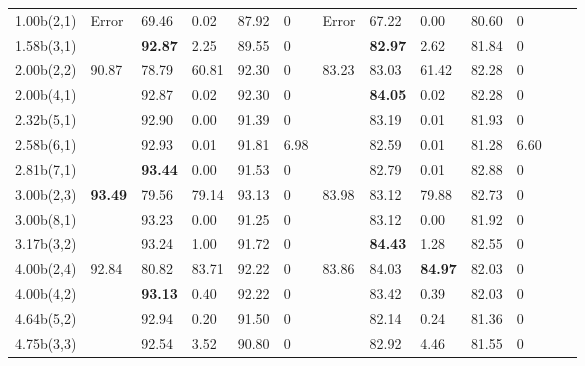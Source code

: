 \documentclass{article}
\theoremstyle{definition}
\theoremstyle{remark}
\begin{document}
\begin{table}[]
\begin{tabular}{|p{1.1cm}| 
    p{0.6cm}| p{0.6cm}| p{0.6cm} |
    p{0.6cm} |p{0.6cm}| p{0.6cm}| 
    p{0.6cm}| p{0.6cm} |p{0.6cm} |
    p{0.6cm}|p{0.6cm}|p{0.6cm}|}
1.00b(2,1)   & \multirow{2}{*}{Error} &	69.46   & 0.02      &  87.92 &	0 		& \multirow{2}{*}{Error} & 67.22 &	0.00  & 80.60	& 0   \\ 
1.58b(3,1)   &                        & \textbf{92.87}   & 2.25      &  89.55 &	0 		&                        & \textbf{82.97} &	2.62  & 81.84	& 0   \\ \cline{2-2} \cline{7-7}
2.00b(2,2)   & \multirow{5}{*}{90.87} &	78.79	& 60.81     &  92.30 &	0 		& \multirow{5}{*}{83.23} & 83.03 &	61.42 & 82.28	& 0   \\
2.00b(4,1)   &                        &	92.87	& 0.02      &  92.30 &	0 		&                        & \textbf{84.05} &	0.02  & 82.28	& 0   \\
2.32b(5,1)   &                        &	92.90	& 0.00      &  91.39 &	0 		&                        & 83.19 &	0.01  & 81.93	& 0   \\
2.58b(6,1)   &                        &	92.93	& 0.01      &  91.81 &	6.98	&                        & 82.59 &	0.01  & 81.28	& 6.60   \\
2.81b(7,1)   &                        &	\textbf{93.44}	& 0.00      &  91.53 &	0 		&                        & 82.79 &	0.01  & 82.88	& 0   \\ \cline{2-2} \cline{7-7}
3.00b(2,3)   & \multirow{3}{*}{\textbf{93.49}} &	79.56	& 79.14     &  93.13 &	0 		& \multirow{3}{*}{83.98} & 83.12 &	79.88 & 82.73	& 0   \\
3.00b(8,1)   &                        &	93.23	& 0.00      &  91.25 &	0 		&                        & 83.12 &	0.00  & 81.92	& 0   \\
3.17b(3,2)   &                        &	93.24	& 1.00      &  91.72 &	0 		&                        & \textbf{84.43} &	1.28  & 82.55	& 0   \\ \cline{2-2} \cline{7-7}
4.00b(2,4)   & \multirow{5}{*}{92.84} &	80.82	& 83.71     &  92.22 &	0 		& \multirow{5}{*}{83.86} & 84.03 &	\textbf{84.97} & 82.03	& 0   \\
4.00b(4,2)   &                        &	\textbf{93.13}	& 0.40      &  92.22 &	0 		&                        & 83.42 &	0.39  & 82.03	& 0   \\
4.64b(5,2)   &                        &	92.94	& 0.20      &  91.50 &	0 		&                        & 82.14 &	0.24  & 81.36	& 0   \\
4.75b(3,3)   &                        &	92.54	& 3.52      &  90.80 &	0 		&                        & 82.92 &	4.46  & 81.55	& 0   \\ \cline{2-2} \cline{7-7}

\end{tabular}
\end{table}
\end{document}
